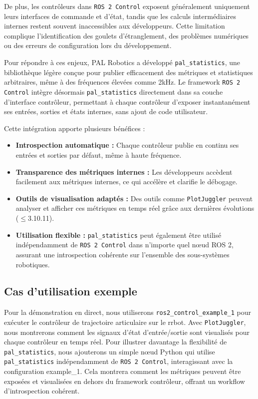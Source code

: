\documentclass[11pt,a4paper]{article}
\begin{document}
De plus, les contrôleurs dans \texttt{ROS 2 Control} exposent généralement
uniquement leurs interfaces de commande et d'état, tandis que les calculs
intermédiaires internes restent souvent inaccessibles aux développeurs. Cette
limitation complique l'identification des goulets d'étranglement, des problèmes
numériques ou des erreurs de configuration lors du développement.

Pour répondre à ces enjeux, PAL Robotics a développé \texttt{pal\_statistics},
une bibliothèque légère conçue pour publier efficacement des métriques et
statistiques arbitraires, même à des fréquences élevées comme 2kHz. Le framework
\texttt{ROS 2 Control} intègre désormais \texttt{pal\_statistics} directement
dans sa couche d'interface contrôleur, permettant à chaque contrôleur d'exposer
instantanément ses entrées, sorties et états internes, sans ajout de code
utilisateur.

Cette intégration apporte plusieurs bénéfices :
\begin{itemize}
  \item \textbf{Introspection automatique :} Chaque contrôleur publie en continu
        ses entrées et sorties par défaut, même à haute fréquence.
  \item \textbf{Transparence des métriques internes :} Les développeurs accèdent
        facilement aux métriques internes, ce qui accélère et clarifie le
        débogage.
  \item \textbf{Outils de visualisation adaptés :} Des outils comme
        \texttt{PlotJuggler} peuvent analyser et afficher ces métriques en temps
        réel grâce aux dernières évolutions ($\leq$3.10.11).
  \item \textbf{Utilisation flexible :} \texttt{pal\_statistics} peut également
        être utilisé indépendamment de \texttt{ROS 2 Control} dans n'importe
        quel n\oe{}ud ROS 2, assurant une introspection cohérente sur l'ensemble des
        sous-systèmes robotiques.
\end{itemize}

\subsection*{Cas d'utilisation exemple}

Pour la démonstration en direct, nous utiliserons
\texttt{ros2\_control\_example\_1} pour exécuter le contrôleur de trajectoire
articulaire sur le rrbot. Avec \texttt{PlotJuggler}, nous montrerons comment les
signaux d'état d'entrée/sortie sont visualisés pour chaque contrôleur en temps
réel. Pour illustrer davantage la flexibilité de \texttt{pal\_statistics}, nous
ajouterons un simple nœud Python qui utilise \texttt{pal\_statistics}
indépendamment de \texttt{ROS 2 Control}, interagissant avec la configuration
example\_1. Cela montrera comment les métriques peuvent être exposées et
visualisées en dehors du framework contrôleur, offrant un workflow
d'introspection cohérent.
\end{document}
